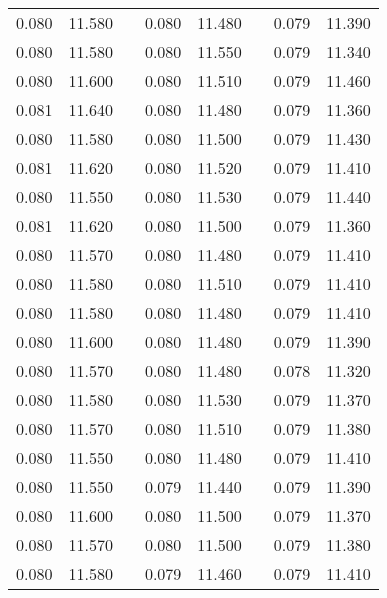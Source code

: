 \documentclass[12pt]{mwrep}
\begin{document}
\begin{table}[H]
\begin{tabularx}{\textwidth}{|Y|Y|p{2mm}|Y|Y|p{2mm}|Y|Y|}
			0.080 & 11.580 && 0.080 & 11.480 && 0.079 & 11.390 \\
			0.080 & 11.580 && 0.080 & 11.550 && 0.079 & 11.340 \\
			0.080 & 11.600 && 0.080 & 11.510 && 0.079 & 11.460 \\
			0.081 & 11.640 && 0.080 & 11.480 && 0.079 & 11.360 \\
			0.080 & 11.580 && 0.080 & 11.500 && 0.079 & 11.430 \\
			0.081 & 11.620 && 0.080 & 11.520 && 0.079 & 11.410 \\
			0.080 & 11.550 && 0.080 & 11.530 && 0.079 & 11.440 \\
			0.081 & 11.620 && 0.080 & 11.500 && 0.079 & 11.360 \\
			0.080 & 11.570 && 0.080 & 11.480 && 0.079 & 11.410 \\
			0.080 & 11.580 && 0.080 & 11.510 && 0.079 & 11.410 \\
			0.080 & 11.580 && 0.080 & 11.480 && 0.079 & 11.410 \\
			0.080 & 11.600 && 0.080 & 11.480 && 0.079 & 11.390 \\
			0.080 & 11.570 && 0.080 & 11.480 && 0.078 & 11.320 \\
			0.080 & 11.580 && 0.080 & 11.530 && 0.079 & 11.370 \\
			0.080 & 11.570 && 0.080 & 11.510 && 0.079 & 11.380 \\
			0.080 & 11.550 && 0.080 & 11.480 && 0.079 & 11.410 \\
			0.080 & 11.550 && 0.079 & 11.440 && 0.079 & 11.390 \\
			0.080 & 11.600 && 0.080 & 11.500 && 0.079 & 11.370 \\
			0.080 & 11.570 && 0.080 & 11.500 && 0.079 & 11.380 \\
			0.080 & 11.580 && 0.079 & 11.460 && 0.079 & 11.410 \\

\end{tabularx}
\end{table}
\end{document}
